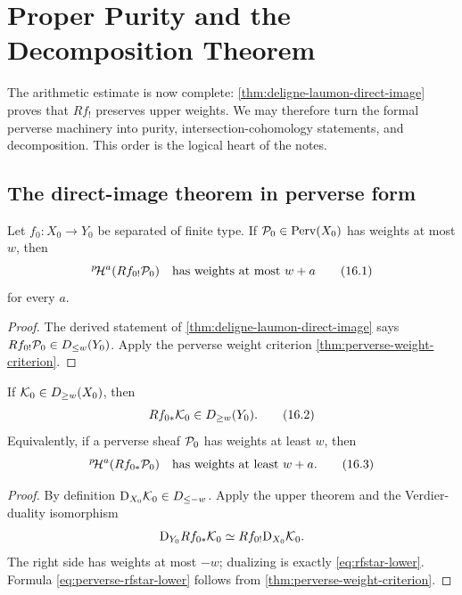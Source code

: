\chapter{Proper Purity and the Decomposition Theorem}
\label{chap:decomposition}

The arithmetic estimate is now complete:
\cref{thm:deligne-laumon-direct-image} proves that \(Rf_!\) preserves upper
weights.  We may therefore turn the formal perverse machinery into purity,
intersection-cohomology statements, and decomposition.  This order is the
logical heart of the notes.

\section{The direct-image theorem in perverse form}

\begin{corollary}
\label{cor:perverse-upper-direct-image}
Let \(f_0:X_0\to Y_0\) be separated of finite type.  If
\(\mathcal P_0\in\operatorname{Perv}(X_0)\) has weights at most \(w\), then
\[
  {}^{p}\!\mathcal H^a(Rf_{0!}\mathcal P_0)
  \quad\text{has weights at most }w+a
\tag{16.1}\label{eq:perverse-rfshriek-upper}
\]
for every \(a\).
\end{corollary}

\begin{proof}
The derived statement of
\cref{thm:deligne-laumon-direct-image} says
\(Rf_{0!}\mathcal P_0\in D_{\leq w}(Y_0)\).  Apply the perverse weight criterion
\cref{thm:perverse-weight-criterion}.
\end{proof}

\begin{corollary}
\label{cor:perverse-lower-direct-image}
If \(\mathcal K_0\in D_{\geq w}(X_0)\), then
\[
  Rf_{0*}\mathcal K_0\in D_{\geq w}(Y_0).
\tag{16.2}\label{eq:rfstar-lower}
\]
Equivalently, if a perverse sheaf \(\mathcal P_0\) has weights at least \(w\), then
\[
  {}^{p}\!\mathcal H^a(Rf_{0*}\mathcal P_0)
  \quad\text{has weights at least }w+a.
\tag{16.3}\label{eq:perverse-rfstar-lower}
\]
\end{corollary}

\begin{proof}
By definition \(\mathrm D_{X_0}\mathcal K_0\in D_{\leq-w}\).  Apply the upper theorem and
the Verdier-duality isomorphism
\[
  \mathrm D_{Y_0}Rf_{0*}\mathcal K_0
  \simeq Rf_{0!}\mathrm D_{X_0}\mathcal K_0.
\]
The right side has weights at most \(-w\); dualizing is exactly
\eqref{eq:rfstar-lower}.  Formula
\eqref{eq:perverse-rfstar-lower} follows from
\cref{thm:perverse-weight-criterion}.
\end{proof}


